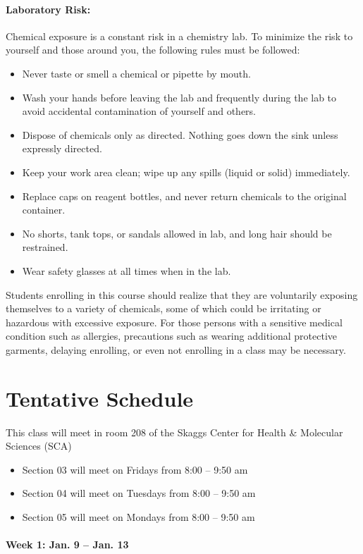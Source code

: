 \documentclass[12pt, letterpaper]{article}
\begin{document}
\paragraph{Laboratory Risk:}
Chemical exposure is a constant risk in a chemistry lab. To minimize the risk to yourself and those around you, the following rules must be followed:
\begin{itemize}
	\item Never taste or smell a chemical or pipette by mouth.
	\item Wash your hands before leaving the lab and frequently during the lab to avoid accidental contamination of yourself and others.
	\item Dispose of chemicals only as directed. Nothing goes down the sink unless expressly directed.
	\item Keep your work area clean; wipe up any spills (liquid or solid) immediately.
	\item Replace caps on reagent bottles, and never return chemicals to the original container.
	\item No shorts, tank tops, or sandals allowed in lab, and long hair should be restrained.
	\item Wear safety glasses at all times when in the lab.
\end{itemize}
Students enrolling in this course should realize that they are voluntarily exposing themselves to a variety of chemicals, some of which could be irritating or hazardous with excessive exposure.  For those persons with a sensitive medical condition such as allergies, precautions such as wearing additional protective garments, delaying enrolling, or even not enrolling in a class may be necessary.

\section*{Tentative Schedule}
This class will meet in room 208 of the Skaggs Center for Health \& Molecular Sciences (SCA)
\begin{itemize}
	\item Section 03 will meet on Fridays from 8:00 – 9:50 am
	\item Section 04 will meet on Tuesdays from 8:00 – 9:50 am
	\item Section 05 will meet on Mondays from 8:00 – 9:50 am
\end{itemize}

\paragraph{Week 1: Jan. 9 -- Jan. 13}~
\end{document}
